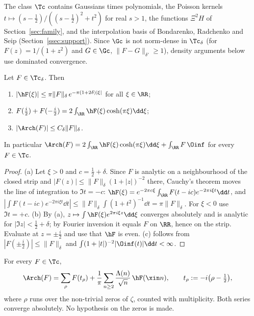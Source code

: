 The class $\Tc$ contains Gaussians times polynomials, the Poisson kernels $t\mapsto(s-\frac12)/((s-\frac12)^2+t^2)$ for real
$s>1$, the functions $\Xi^2H$ of Section~\ref{sec:family}, and the interpolation basis of Bondarenko, Radchenko and Seip
(Section~\ref{ssec:support}). Since $\Gc$ is not norm-dense in $\Tc_\delta$ (for $F(z)=1/(1+z^2)$ and $G\in\Gc$,
$\|F-G\|_{\delta'}\ge1$), density arguments below use dominated convergence.

\begin{lemma}\label{lem:testclass}
Let $F\in\Tc_\delta$. Then
\begin{enumerate}[label=\textup{(\alph*)}]
\item $|\hF(\xi)|\le\pi\|F\|_\delta\,e^{-\pi(1+2\delta)|\xi|}$ for all $\xi\in\RR$;
\item $F(\tfrac i2)+F(-\tfrac i2)=2\int_\RR\hF(\xi)\cosh(\pi\xi)\dd\xi$;
\item $|\Arch(F)|\le C_\delta\|F\|_\delta$.
\end{enumerate}
In particular $\Arch(F)=2\int_\RR\hF(\xi)\cosh(\pi\xi)\dd\xi+\int_\RR F\,\Oinf$ for every $F\in\Tc$.
\end{lemma}

\begin{proof}
(a) Let $\xi>0$ and $c=\frac12+\delta$. Since $F$ is analytic on a neighbourhood of the closed strip and
$|F(z)|\le\|F\|_\delta(1+|z|)^{-2}$ there, Cauchy's theorem moves the line of integration to $\Im t=-c$:
$\hF(\xi)=e^{-2\pi c\xi}\int_\RR F(t-ic)e^{-2\pi i\xi t}\dd t$, and
$|\int F(t-ic)e^{-2\pi i\xi t}\dd t|\le\|F\|_\delta\int(1+t^2)^{-1}\dd t=\pi\|F\|_\delta$. For $\xi<0$ use $\Im t=+c$.
(b) By (a), $z\mapsto\int\hF(\xi)e^{2\pi i\xi z}\dd\xi$ converges absolutely and is analytic for
$|\Im z|<\frac12+\delta$; by Fourier inversion it equals $F$ on $\RR$, hence on the strip. Evaluate at $z=\pm\frac i2$
and use that $\hF$ is even. (c) follows from $|F(\pm\frac i2)|\le\|F\|_\delta$ and
$\int(1+|t|)^{-2}|\Oinf(t)|\dd t<\infty$.
\end{proof}

\begin{lemma}\label{lem:explicit-formula}
For every $F\in\Tc$,
\begin{equation}\label{eq:EF}
\Arch(F)=\sum_\rho F(t_\rho)+\frac1\pi\sum_{n\ge2}\frac{\Lambda(n)}{\sqrt n}\,\hF(\xin n),\qquad t_\rho:=-i\big(\rho-\tfrac12\big),
\end{equation}
where $\rho$ runs over the non-trivial zeros of $\zeta$, counted with multiplicity. Both series converge absolutely.
No hypothesis on the zeros is made.
\end{lemma}

